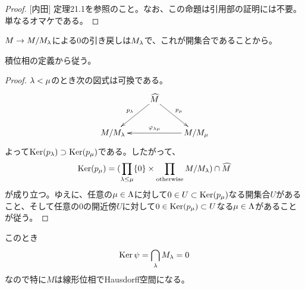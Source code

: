 \begin{proof}
    ${}$[内田]\cite{内田} 定理21.1を参照のこと。なお、この命題は引用部の証明には不要。単なるオマケである。
\end{proof}


\begin{rem}
  $M \to M/M_{{\lambda}}$による$0$の引き戻しは$M_{{\lambda}}$で、これが開集合であることから。
\end{rem}


\begin{rem}
  積位相の定義から従う。
\end{rem}


\begin{proof}
  ${\lambda} < \mu$のとき次の図式は可換である。
  \[
  \xymatrix{
  {} & \wh{M} \ar[ld]_-{p_{\grl}} \ar[dr]^-{p_{\mu}} & {} \\
M/M_{\grl} & {} & M/M_{\mu} \ar[ll]_-{\vp_{\grl \mu}}
  }
  \]
  よって$\operatorname{Ker} (p_{{\lambda}}) \supset \operatorname{Ker}(p_{\mu})$である。したがって、
  \[
  \operatorname{Ker} (p_{\mu}) = (\prod_{{\lambda} \leq \mu} \{0\} \times \prod_{\text{otherwise}} M/M_{{\lambda}}) \cap \widehat{M}
  \]
  が成り立つ。ゆえに、任意の$\mu \in {\Lambda}$に対して$0 \in U \subset \operatorname{Ker}(p_{\mu})$なる開集合$U$があること、そして任意の$0$の開近傍$U$に対して$0 \in \operatorname{Ker}(p_{\mu}) \subset U$なる$\mu \in {\Lambda}$があることが従う。
\end{proof}



\begin{rem}
  このとき
  \[
  \operatorname{Ker} \psi = \bigcap_{{\lambda} } M_{{\lambda}} = 0
  \]
  なので特に$M$は線形位相でHausdorff空間になる。
\end{rem}



